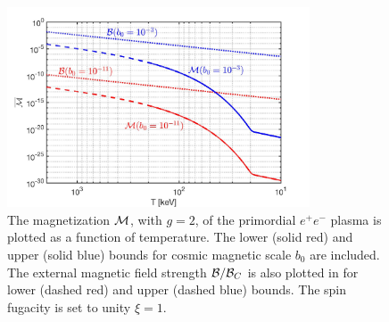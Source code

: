 \documentclass[a4paper]{article}
\begin{document}
\begin{figure}[ht]
    \centering
    \includegraphics[width=0.8\textwidth]{Magnetization_Hc_new002.jpg}
    \caption{The magnetization ${\cal M}$, with $g=2$, of the primordial $e^{+}e^{-}$ plasma is plotted as a function of temperature. The lower (solid red) and upper (solid blue) bounds for cosmic magnetic scale $b_{0}$ are included. The external magnetic field strength ${\cal B}/{\cal B}_{C}$ is also plotted in for lower (dashed red) and upper (dashed blue) bounds. The spin fugacity is set to unity $\xi=1$.}
    \label{fig:magnet} 
\end{figure}
\end{document}
